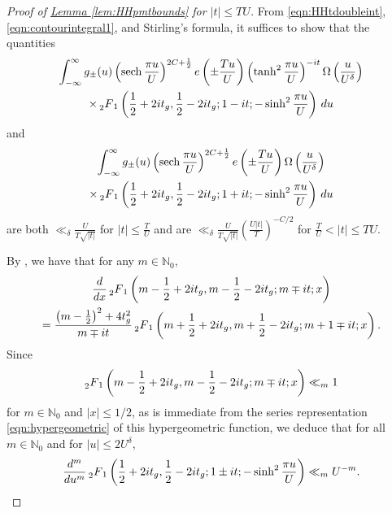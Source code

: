 \documentclass[11pt,a4paper]{amsart}
\newcommand{\N}{\mathbb{N}}
\DeclareMathOperator{\sech}{sech}
\numberwithin{equation}{section}
\theoremstyle{remark}
\theoremstyle{definition}
\begin{document}
\begin{proof}[Proof of {\hyperref[lem:HHpmtbounds]{Lemma \ref*{lem:HHpmtbounds}}} for $|t| \leq TU$]
From \eqref{eqn:HHtdoubleint}, \eqref{eqn:contourintegral1}, and Stirling's formula, it suffices to show that the quantities
\begin{multline}
\label{eqn:oscillatory}
\int_{-\infty}^{\infty} g_{\pm}(u) \left(\sech \frac{\pi u}{U}\right)^{2C + \frac{1}{2}} e\left(\pm \frac{Tu}{U}\right) \left(\tanh^2 \frac{\pi u}{U}\right)^{-it} \Omega\left(\frac{u}{U^{\delta}}\right)	\\
\times \prescript{}{2}{F}_1\left(\frac{1}{2} + 2it_g,\frac{1}{2} - 2it_g;1 - it; -\sinh^2 \frac{\pi u}{U}\right) \, du
\end{multline}
and
\begin{multline}
\label{eqn:nonoscillatory}
\int_{-\infty}^{\infty} g_{\pm}(u) \left(\sech \frac{\pi u}{U}\right)^{2C + \frac{1}{2}} e\left(\pm \frac{Tu}{U}\right) \Omega\left(\frac{u}{U^{\delta}}\right)	\\
\times \prescript{}{2}{F}_1\left(\frac{1}{2} + 2it_g,\frac{1}{2} - 2it_g;1 + it; -\sinh^2 \frac{\pi u}{U}\right) \, du
\end{multline}
are both $\ll_{\delta} \frac{U}{T\sqrt{|t|}}$ for $|t| \leq \frac{T}{U}$ and are $\ll_{\delta} \frac{U}{T\sqrt{|t|}} (\frac{U|t|}{T})^{-C/2}$ for $\frac{T}{U} < |t| \leq TU$.

By \cite[9.103.1]{GR15}, we have that for any $m \in \N_0$,
\begin{multline*}
\frac{d}{dx} \prescript{}{2}{F}_1\left(m - \frac{1}{2} + 2it_g,m - \frac{1}{2} - 2it_g;m \mp it; x\right)	\\
= \frac{\left(m - \frac{1}{2}\right)^2 + 4t_g^2}{m \mp it} \prescript{}{2}{F}_1\left(m + \frac{1}{2} + 2it_g,m + \frac{1}{2} - 2it_g;m + 1 \mp it;x\right).
\end{multline*}
Since
\[\prescript{}{2}{F}_1\left(m - \frac{1}{2} + 2it_g,m - \frac{1}{2} - 2it_g;m \mp it;x\right) \ll_m 1\]
for $m \in \N_0$ and $|x| \leq 1/2$, as is immediate from the series representation \eqref{eqn:hypergeometric} of this hypergeometric function, we deduce that for all $m \in \N_0$ and for $|u| \leq 2U^{\delta}$,
\begin{equation}
\label{eqn:2F1derivbounds}
\frac{d^m}{du^m} \prescript{}{2}{F}_1\left(\frac{1}{2} + 2it_g,\frac{1}{2} - 2it_g;1 \pm it; -\sinh^2 \frac{\pi u}{U}\right) \ll_m U^{-m}.
\end{equation}


\end{proof}
\end{document}
